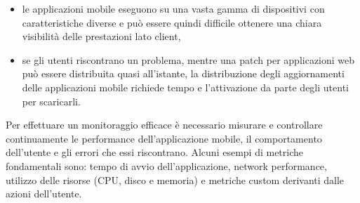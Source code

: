 \begin{itemize}
    \item le applicazioni mobile eseguono su una vasta gamma di dispositivi con caratteristiche diverse e può essere quindi difficile ottenere una chiara visibilità delle prestazioni lato client,
    
    \item se gli utenti riscontrano un problema, mentre una patch per applicazioni web può essere distribuita quasi all'istante, la distribuzione degli aggiornamenti delle applicazioni mobile richiede tempo e l'attivazione da parte degli utenti per scaricarli.
\end{itemize}

Per effettuare un monitoraggio efficace è necessario misurare e controllare continuamente le performance dell'applicazione mobile, 
il comportamento dell'utente e gli errori che essi riscontrano. 
Alcuni esempi di metriche fondamentali sono: 
tempo di avvio dell'applicazione, 
network performance, 
utilizzo delle risorse (CPU, disco e memoria) e metriche custom derivanti dalle azioni dell'utente.